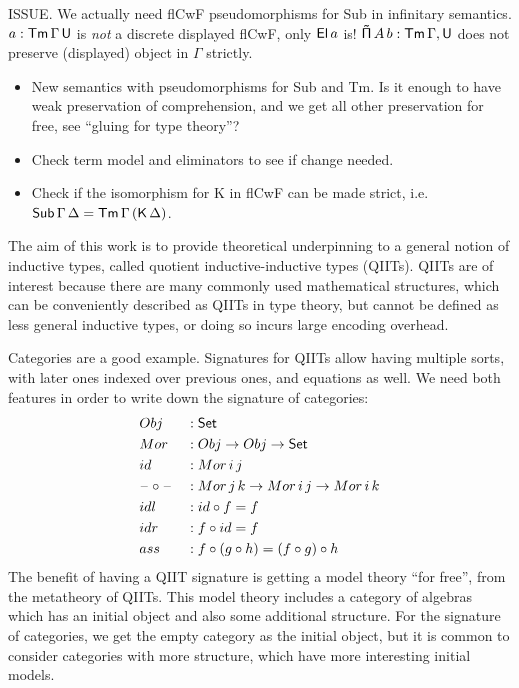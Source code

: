 \documentclass{llncs}
\newcommand{\Piinf}{\mathsf{\tilde{\Pi}}}
\newcommand{\Kfam}{\mathsf{K}}
\begin{document}
ISSUE. We actually need flCwF pseudomorphisms for Sub in infinitary semantics.
$a : \mathsf{Tm}\,\Gamma\,\mathsf{U}$ is \emph{not} a discrete displayed flCwF, only $\mathsf{El}\,a$ is!
$\Piinf\,A\,b : \Tm\,\Gamma,\U$ does not preserve (displayed) object in $\Gamma$
strictly.

\begin{itemize}
\item New semantics with pseudomorphisms for Sub and Tm. Is it enough to
      have weak preservation of comprehension, and we get all other preservation
      for free, see ``gluing for type theory''?
\item Check term model and eliminators to see if change needed.
\item Check if the isomorphism for K in flCwF can be made strict, i.e.
      $\Sub\,\Gamma\,\Delta = \Tm\,\Gamma\,(\Kfam\,\Delta)$.
\end{itemize}



The aim of this work is to provide theoretical underpinning to a general notion
of inductive types, called quotient inductive-inductive types (QIITs). QIITs are
of interest because there are many commonly used mathematical structures, which
can be conveniently described as QIITs in type theory, but cannot be defined as
less general inductive types, or doing so incurs large encoding overhead.

Categories are a good example. Signatures for QIITs allow having multiple sorts,
with later ones indexed over previous ones, and equations as well. We need both
features in order to write down the signature of categories:
\begin{alignat*}{3}
  & Obj && : \mathsf{Set} \\
  & Mor && : Obj \rightarrow Obj \rightarrow \mathsf{Set} \\
  & id  && : Mor\,i\,j \\
  & \mathord{\hspace{1pt}\text{--}\hspace{1pt}}\circ\mathord{\hspace{1pt}\text{--}\hspace{1pt}} && : Mor\,j\,k\rightarrow Mor\,i\,j \rightarrow Mor\,i\,k \\
  & idl && : id \circ f = f \\
  & idr && : f \circ id = f \\
  & ass && : f \circ (g \circ h) = (f \circ g) \circ h
\end{alignat*}
The benefit of having a QIIT signature is getting a model theory ``for free'',
from the metatheory of QIITs. This model theory includes a category of algebras
which has an initial object and also some additional structure. For the
signature of categories, we get the empty category as the initial object, but it
is common to consider categories with more structure, which have more
interesting initial models.
\end{document}
